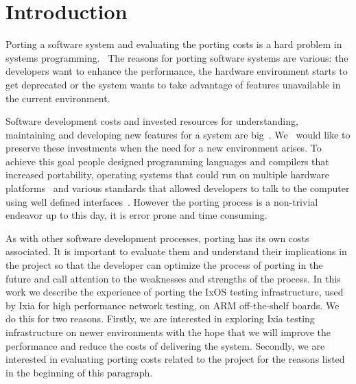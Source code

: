 \chapter{Introduction}\pagestyle{fancy}

Porting a software system and evaluating the porting costs is a hard problem in
systems
programming.~\cite{tanaka,hakuta,mooney2004developing,kanai,porquet2015,
bodenstab1984unix,osdevcrossport,jolitz1990porting,frakes1995sixteen,
tanenbaum1978guidelines,johnson1978unix}
The reasons for porting software systems are various: the developers want to
enhance the performance, the hardware environment starts to get deprecated or
the system wants to take advantage of features unavailable in the current
environment.

Software development costs and invested resources for understanding, maintaining
and developing new features for a system are
big~\cite{xia2017measuring,boehm2000software,morgan1994controlling}. We~ would
like to preserve these investments when the need for a new environment arises.
To achieve this goal people designed programming languages and compilers that
increased portability, operating systems that could run on multiple hardware
platforms~\cite{johnson1978unix} and various standards that allowed developers to talk to
the computer using well defined interfaces~\cite{walli1995posix}. However the porting
process is a non-trivial endeavor up to this day, it is error prone and time
consuming.

As with other software development processes, porting has its own costs
associated. It is important to evaluate them and understand their implications
in the project so that the developer can optimize the process of porting in the
future and call attention to the weaknesses and strengths of the process. In
this work we describe the experience of porting the IxOS testing infrastructure,
used by Ixia for high performance network testing, on ARM off-the-shelf boards.
We do this for two reasons. Firstly, we are interested in exploring Ixia testing
infrastructure on newer environments with the hope that we will improve the
performance and reduce the costs of delivering the system. Secondly, we are
interested in evaluating porting costs related to the project for the reasons
listed in the beginning of this paragraph.~

